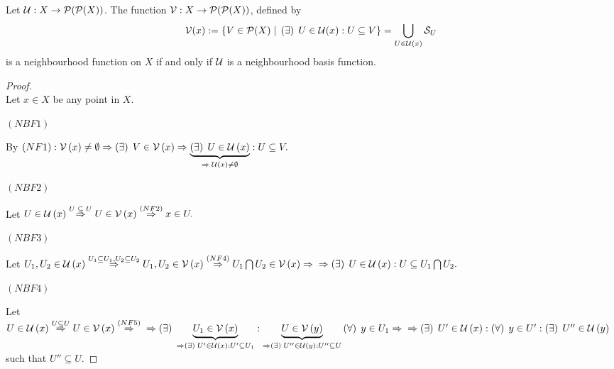 \documentclass[a4paper,12pt]{report}
\newcommand{\nbh}[1]
{
\cg{V}\left(#1\right)
}
\newcommand{\nbhb}[1]
{
\cg{U}\left(#1\right)
}
\begin{document}
\mth
{
\quad Let $\mathcal{U}:X\to \mathcal{P}(\mathcal{P}(X))$. The function $\mathcal{V}:X\to\mathcal{P}(\mathcal{P}(X))$, defined by 
\[ \mathcal{V}(x) := \{ V\in\mathcal{P}(X)\;|\; \left(\exists\right)\; U \in \mathcal{U}(x): U\subseteq V \} = \bigcup_{U \in \mathcal{U}(x)} \mathcal{S}_U \] is a neighbourhood function on $X$ if and only if $\mathcal{U}$ is a neighbourhood basis function.
}

\begin{proof}
\necessity\\
Let $x\in X$ be any point in $X$.

\begin{center}
$\left(NBF1\right)$
\end{center}
By $\left(NF1\right): \nbh{x} \neq \emptyset \Rightarrow \fe{\exists} V \in \nbh{x} \Rightarrow \underbrace{\fe{\exists} U\in\nbhb{x}}_{\Rightarrow\; \nbhb{x} \neq \emptyset}: U\subseteq V.$ 

\begin{center}
$\left(NBF2\right)$
\end{center}

Let $U\in\nbhb{x} \overset{U\;\subseteq\; U}{\Rightarrow} U\in \nbh{x} \overset{\left(NF2\right)}{\Rightarrow} x\in U.$

\begin{center}
$\left(NBF3\right)$
\end{center}

Let $U_1,U_2 \in \nbhb{x} \overset{U_1\subseteq U_1,U_2\subseteq U_2}{\Rightarrow} U_1,U_2\in\nbh{x} \overset{\left(NF4\right)}{\Rightarrow} U_1 \bigcap U_2 \in \nbh{x} \Rightarrow \\ \Rightarrow \fe{\exists} U\in \nbhb{x}: U \subseteq U_1\bigcap	U_2.$

\begin{center}
$\left(NBF4\right)$
\end{center}

Let $U\in\nbhb{x} \overset{U\subseteq U}{\Rightarrow} U\in\nbh{x} \overset{\left(NF5\right)}{\Rightarrow} \\ \Rightarrow \fe{\exists} \underbrace{U_1 \in \nbh{x}}_{\Rightarrow \fe{\exists} U' \in\nbhb{x}: U' \subseteq U_1 }: \underbrace{U \in \nbh{y}}_{\Rightarrow \fe{\exists} U'' \in\nbhb{y}: U''\subseteq U}  \fe{\forall} y \in U_1 \Rightarrow \\ \Rightarrow \fe{\exists} U'\in\nbhb{x}: \fe{\forall} y \in U': \fe{\exists} U'' \in\nbhb{y} $ such that $U''\subseteq U.$

\end{proof}
\end{document}
